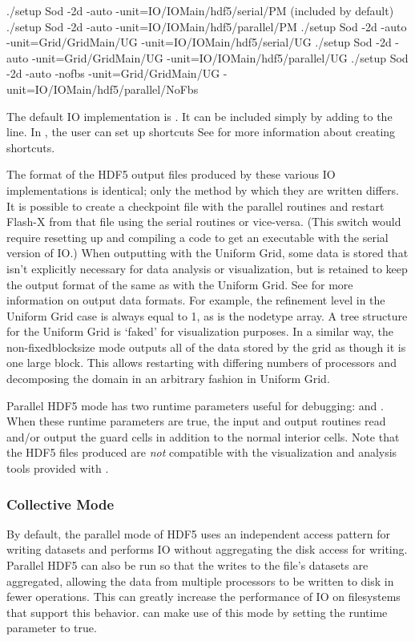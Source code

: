 \begin{codeseg}
./setup Sod -2d -auto -unit=IO/IOMain/hdf5/serial/PM (included by default)
./setup Sod -2d -auto -unit=IO/IOMain/hdf5/parallel/PM
./setup Sod -2d -auto -unit=Grid/GridMain/UG -unit=IO/IOMain/hdf5/serial/UG
./setup Sod -2d -auto -unit=Grid/GridMain/UG -unit=IO/IOMain/hdf5/parallel/UG
./setup Sod -2d -auto -nofbs -unit=Grid/GridMain/UG -unit=IO/IOMain/hdf5/parallel/NoFbs
\end{codeseg}

The default IO implementation is .
It can be included simply by adding  to the 
line.  In \flashx, the user can set up
shortcuts%
See
 for
more information about creating shortcuts.


The format of the HDF5 output files produced by these various IO
implementations is identical; only the method by which they are
written differs.  It is possible to create a checkpoint file with the
parallel routines and restart Flash-X from that file using the serial
routines or vice-versa.  (This switch would require resetting up and compiling a code to
get an executable with the serial version of IO.)
When outputting with the Uniform Grid, some
data is stored that isn't explicitly necessary for data analysis or
visualization, but is retained to keep the output format of \Paramesh
the same as with the Uniform Grid.  See  for
more information on output data formats.  For example, the refinement
level in the Uniform Grid case is always equal to 1, as is the
nodetype array.  A tree structure for the Uniform Grid is `faked' for visualization purposes.
In a similar way, the non-fixedblocksize mode outputs all of the data stored by the grid as 
though it is one large block.  This allows restarting with differing numbers of processors
and decomposing the domain in an arbitrary fashion in Uniform Grid.

Parallel HDF5 mode has two runtime parameters useful for debugging:
 and .  When 
these runtime parameters
are true, the \flashx input and output routines read and/or output the guard cells
in addition to the normal interior cells.  Note that the HDF5 files produced are {\em not} 
compatible with the visualization and analysis tools provided with \flashx.



\subsubsection{Collective Mode}
\label{sec:IOCollectiveMode}
By default, the parallel mode of HDF5 uses an independent access pattern for 
writing datasets and performs IO without aggregating the disk access for 
writing.  Parallel HDF5 can also be run so that the writes to the file's 
datasets are aggregated, allowing the data
from multiple processors to be written to disk in fewer operations.  This can 
greatly increase the performance of IO on filesystems that support this behavior.
  \flashx can make use of this mode by setting the runtime parameter  to true.


